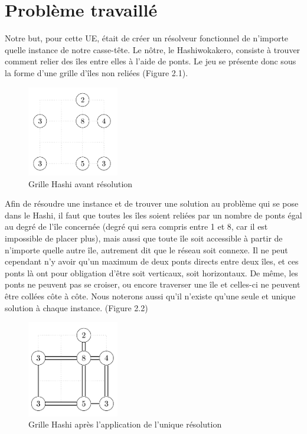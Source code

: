 \chapter{Problème travaillé}
\label{chap:probleme}

Notre but, pour cette UE, était de créer un résolveur fonctionnel de n'importe quelle instance de notre casse-tête. Le nôtre, le Hashiwokakero, consiste à trouver comment relier des îles entre elles à l'aide de ponts. Le jeu se présente donc sous la forme d'une grille d'îles non reliées (Figure 2.1). 
\newline
\begin{figure}[htp]
  \centering
  \includegraphics[width=4cm]{images/GrilleHashi}
  \caption{Grille Hashi avant résolution}
\end{figure}

Afin de résoudre une instance et de trouver une solution au problème qui se pose dans le Hashi, il faut que toutes les îles soient reliées par un nombre de ponts égal au degré de l'île concernée (degré qui sera compris entre 1 et 8, car il est impossible de placer plus), mais aussi que toute île soit accessible à partir de n'importe quelle autre île, autrement dit que le réseau soit connexe. Il ne peut cependant n'y avoir qu'un maximum de deux ponts directs entre deux îles, et ces ponts là ont pour obligation d'être soit verticaux, soit horizontaux. De même, les ponts ne peuvent pas se croiser, ou encore traverser une île et celles-ci ne peuvent être collées côte à côte. Nous noterons aussi qu'il n'existe qu'une seule et unique solution à chaque instance. (Figure 2.2) 
\newline \newline 

\begin{figure}[htp]
  \centering
  \includegraphics[width=4cm]{images/GrilleHashiResolu}
  \caption{Grille Hashi après l'application de l'unique résolution}
\end{figure}

